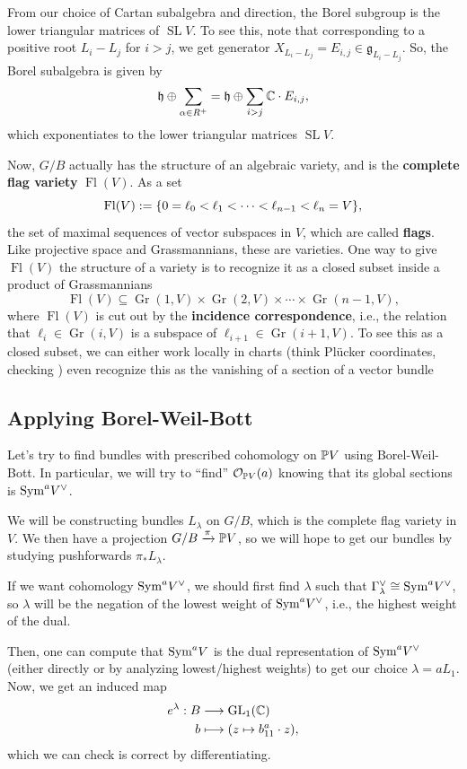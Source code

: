 \documentclass[12pt]{article}
\newcommand{\fg}{\mathfrak{g}}
\newcommand{\fh}{\mathfrak{h}}
\DeclareMathOperator{\SL}{SL}
\DeclareMathOperator{\Fl}{Fl}
\DeclareMathOperator{\Gr}{Gr}
\begin{document}
From our choice of Cartan subalgebra and direction, the Borel subgroup is the lower triangular matrices of $\SL V$.  To see this, note that corresponding to a positive root $L_i-L_j$ for $i>j$, we get generator $X_{L_i-L_j}=E_{i,j} \in \fg_{L_i-L_j}$. So, the Borel subalgebra is given by
\[\fh \oplus \sum_{\alpha\in R^+} = \fh \oplus \sum_{i>j} \C\cdot E_{i,j},\]
which exponentiates to the lower triangular matrices $\SL V$.

Now, $G/B$ actually has the structure of an algebraic variety, and is the \textbf{complete flag variety} $\Fl(V)$. As a set
\[\Fl(V) \defeq \{0=\ell_0 < \ell_1 < \cdots < \ell_{n-1} < \ell_n=V\},\]
the set of maximal sequences of vector subspaces in $V$, which are called \textbf{flags}. Like projective space and Grassmannians, these are varieties. One way to give $\Fl(V)$ the structure of a variety is to recognize it as a closed subset inside a product of Grassmannians
\[\Fl(V) \subseteq \Gr(1,V) \times \Gr(2,V) \times \cdots \times \Gr(n-1,V),\]
where $\Fl(V)$ is cut out by the \textbf{incidence correspondence}, i.e., the relation that $\ell_i \in \Gr(i,V)$ is a subspace of $\ell_{i+1} \in \Gr(i+1,V)$. To see this as a closed subset, we can either work locally in charts (think Pl\"ucker coordinates, checking ) even recognize this as the vanishing of a section of a vector bundle

\subsection{Applying Borel-Weil-Bott}

Let's try to find bundles with prescribed cohomology on $\P V$ using Borel-Weil-Bott. In particular, we will try to ``find'' $\cO_{\P V}(a)$ knowing that its global sections is $\Sym^a V^\vee$.

We will be constructing bundles $L_\lambda$ on $G/B$, which is the complete flag variety in $V$. We then have a projection $G/B \xrightarrow{\pi} \P V$, so we will hope to get our bundles by studying pushforwards $\pi_* L_\lambda$.

If we want cohomology $\Sym^a V^\vee$, we should first find $\lambda$ such that $\Gamma_\lambda^\vee \cong \Sym^a V^\vee$, so $\lambda$ will be the negation of the lowest weight of $\Sym^a V^\vee$, i.e., the highest weight of the dual.

Then, one can compute that $\Sym^a V$ is the dual representation of $\Sym^a V^\vee$ (either directly or by analyzing lowest/highest weights) to get our choice $\lambda = aL_1$. Now, we get an induced map
\begin{align*}
    e^\lambda: B &\longrightarrow \GL_1(\C)\\
    b &\longmapsto (z \mapsto b_{11}^a \cdot z),
\end{align*}
which we can check is correct by differentiating.
\end{document}
